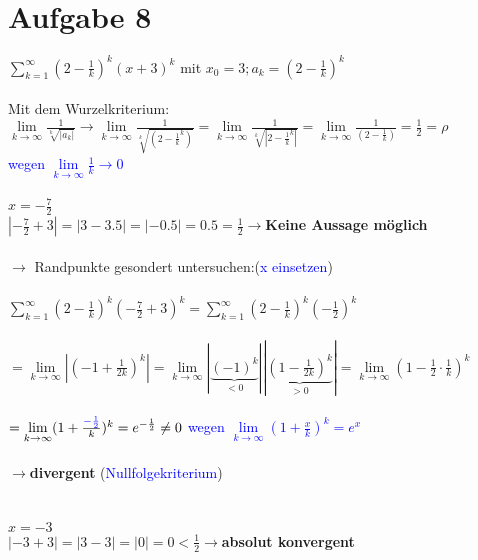 \documentclass[12pt,a4paper]{article}
\begin{document}
\section*{Aufgabe 8}
$\sum\limits_{k=1}^{\infty}(2-\frac{1}{k})^k(x+3)^k$ mit $x_0=3; a_k=(2-\frac{1}{k})^k$\\
\\
Mit dem Wurzelkriterium:\\
$\lim\limits_{k\rightarrow\infty}\frac{1}{\sqrt[k]{|a_k|}} \rightarrow \lim\limits_{k\rightarrow\infty}\frac{1}{\sqrt[k]{(2-\frac{1}{k}^k)}}=\lim\limits_{k\rightarrow\infty}\frac{1}{\sqrt[k]{|2-\frac{1}{k}^k|}}=\lim\limits_{k\rightarrow\infty}\frac{1}{(2-\frac{1}{k})}=\frac{1}{2}=\rho$\\
\textcolor{blue}{wegen $\lim\limits_{k\rightarrow\infty}\frac{1}{k}\rightarrow 0$}
\\
\\
$x = -\frac{7}{2}$
\\
$|-\frac{7}{2}+3|=|3-3.5|=|-0.5|=0.5 = \frac{1}{2} \rightarrow $\textbf{Keine Aussage möglich}
\\
\\
$\rightarrow$ Randpunkte gesondert untersuchen:(\textcolor{blue}{x einsetzen})\\
\\
$\sum\limits_{k=1}^{\infty}(2-\frac{1}{k})^k(-\frac{7}{2}+3)^k = \sum\limits_{k=1}^{\infty}(2-\frac{1}{k})^k(-\frac{1}{2})^k$\\
\\
$=\lim\limits_{k\rightarrow \infty}|(-1+\frac{1}{2k})^k|=\lim\limits_{k\rightarrow \infty}|\underbrace{(-1)^k}_{<0}||\underbrace{(1-\frac{1}{2k})^k}_{>0}|=\lim\limits_{k\rightarrow \infty}(1-\frac{1}{2}\cdot \frac{1}{k})^k$\\
\\
$=\lim\limits_{k\rightarrow \infty}(1+\frac{\textcolor{blue}{-\frac{1}{2}}}{k})^k = e^{-\frac{1}{2}} \neq 0 $ \textcolor{blue}{ wegen $\lim\limits_{k\rightarrow \infty}(1+\frac{x}{k})^k =e^x$}
\\
\\
$\rightarrow $\textbf{divergent } (\textcolor{blue}{Nullfolgekriterium})
\\
\\
\\
$x = -3$
\\
$|-3+3|=|3-3|=|0|=0 < \frac{1}{2} \rightarrow $\textbf{absolut konvergent}
\newpage
\end{document}
